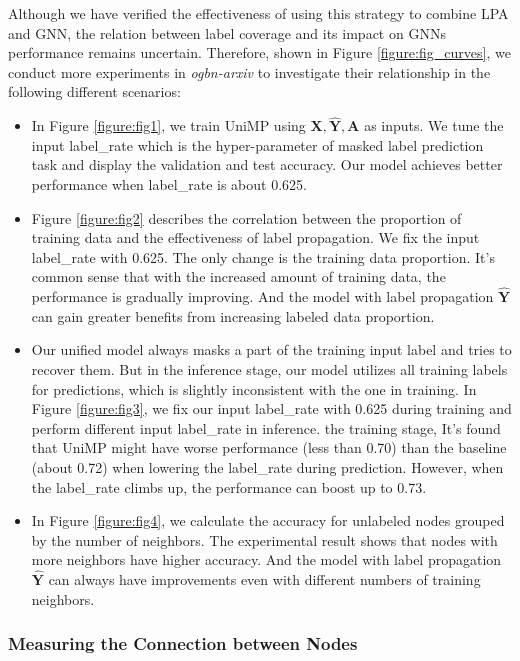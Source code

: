  Although we have verified the effectiveness of using this strategy to combine LPA and GNN, the relation between label coverage and its impact on GNNs performance remains uncertain. Therefore, shown in Figure \ref{figure:fig_curves}, we conduct more experiments in \emph{ogbn-arxiv} to investigate their relationship in the following different scenarios:
\begin{itemize}
	\item In Figure \ref{figure:fig1}, we train UniMP using $\mathbf{X, \hat{Y}, A}$ as inputs. We tune the input label\_rate which is the hyper-parameter of masked label prediction task and display the validation and test accuracy. Our model achieves better performance when label\_rate is about 0.625.
	\item Figure \ref{figure:fig2} describes the correlation between the proportion of training data and the effectiveness of label propagation. We fix the input label\_rate with 0.625. The only change is the training data proportion. It's common sense that with the increased amount of training data, the performance is gradually improving. And the model with label propagation ${\mathbf{{\hat{Y}}}}$ can gain greater benefits from increasing labeled data proportion.
	\item Our unified model always masks a part of the training input label and tries to recover them. But in the inference stage, our model utilizes all training labels for predictions, which is slightly inconsistent with the one in training. In Figure \ref{figure:fig3}, we fix our input label\_rate with 0.625 during training and perform different input label\_rate in inference. the training stage, It's found that UniMP might have worse performance (less than 0.70) than the baseline (about 0.72) when lowering the label\_rate during prediction. However, when the label\_rate climbs up, the performance can boost up to 0.73.
	
	\item In Figure \ref{figure:fig4}, we calculate the accuracy for unlabeled nodes grouped by the number of neighbors. The experimental result shows that nodes with more neighbors have higher accuracy. And the model with label propagation ${\mathbf{\hat{Y}}}$ can always have improvements even with different numbers of training neighbors.
\end{itemize}


\subsubsection{Measuring the Connection between Nodes}


